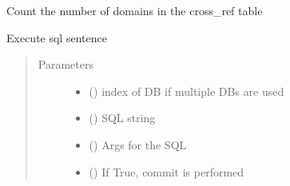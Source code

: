 \documentclass[letterpaper,10pt,english]{sphinxmanual}
\begin{document}
\begin{fulllineitems}
\begin{fulllineitems}
\label{\detokenize{bbc1.core.data_handler:bbc1.core.data_handler.DataHandler.RESPONSE_SEARCH}}
\end{fulllineitems}


\begin{fulllineitems}
\label{\detokenize{bbc1.core.data_handler:bbc1.core.data_handler.DataHandler.count_domain_in_cross_ref}}
Count the number of domains in the cross\_ref table

\end{fulllineitems}


\begin{fulllineitems}
\label{\detokenize{bbc1.core.data_handler:bbc1.core.data_handler.DataHandler.exec_sql}}
Execute sql sentence
\begin{quote}\begin{description}
\item[{Parameters}] \leavevmode\begin{itemize}
\item {} 
 () \textendash{} index of DB if multiple DBs are used

\item {} 
 () \textendash{} SQL string

\item {} 
 () \textendash{} Args for the SQL

\item {} 
 () \textendash{} If True, commit is performed


\end{itemize}
\end{description}
\end{quote}
\end{fulllineitems}
\end{fulllineitems}
\end{document}
